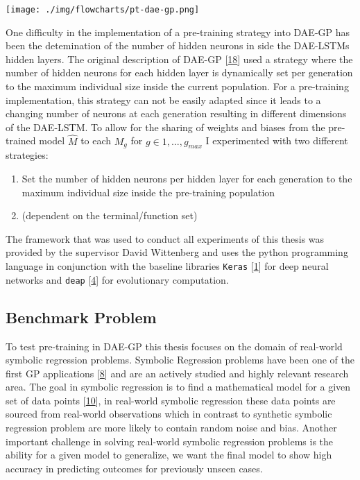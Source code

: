 \documentclass[
  11pt,
]{article}
\providecommand{\tightlist}{%
  \setlength{\itemsep}{0pt}\setlength{\parskip}{0pt}}
\let\origfigure\figure
\let\endorigfigure\endfigure
\renewenvironment{figure}[1][2] {
    \expandafter\origfigure\expandafter[H]
} {
    \endorigfigure
}
\begin{document}
\begin{figure}
\centering
\texttt{[image: ./img/flowcharts/pt-dae-gp.png]}
\caption{Flowchart - Pre-Trained DAE-GP}
\end{figure}

One difficulty in the implementation of a pre-training strategy into
DAE-GP has been the detemination of the number of hidden neurons in side
the DAE-LSTMs hidden layers. The original description of DAE-GP
{[}\protect\hyperlink{ref-dae-gp_2020_rtree}{18}{]} used a strategy
where the number of hidden neurons for each hidden layer is dynamically
set per generation to the maximum individual size inside the current
population. For a pre-training implementation, this strategy can not be
easily adapted since it leads to a changing number of neurons at each
generation resulting in different dimensions of the DAE-LSTM. To allow
for the sharing of weights and biases from the pre-trained model
\(\hat{M}\) to each \(M_g\) for \(g\in{1,...,g_{max}}\) I experimented
with two different strategies:

\begin{enumerate}
\def\labelenumi{\arabic{enumi}.}
\tightlist
\item
  Set the number of hidden neurons per hidden layer for each generation
  to the maximum individual size inside the pre-training population
\item
  (dependent on the terminal/function set)
\end{enumerate}

The framework that was used to conduct all experiments of this thesis
was provided by the supervisor David Wittenberg and uses the python
programming language in conjunction with the baseline libraries
\texttt{Keras} {[}\protect\hyperlink{ref-chollet2015keras}{1}{]} for
deep neural networks and \texttt{deap}
{[}\protect\hyperlink{ref-DEAP_JMLR2012}{4}{]} for evolutionary
computation.

\hypertarget{benchmark-problem}{%
\subsection{Benchmark Problem}\label{benchmark-problem}}

To test pre-training in DAE-GP this thesis focuses on the domain of
real-world symbolic regression problems. Symbolic Regression problems
have been one of the first GP applications
{[}\protect\hyperlink{ref-Koza1993GeneticP}{8}{]} and are an actively
studied and highly relevant research area. The goal in symbolic
regression is to find a mathematical model for a given set of data
points
{[}\protect\hyperlink{ref-10.1007ux2f978-3-540-24621-3_22}{10}{]}, in
real-world symbolic regression these data points are sourced from
real-world observations which in contrast to synthetic symbolic
regression problem are more likely to contain random noise and bias.
Another important challenge in solving real-world symbolic regression
problems is the ability for a given model to generalize, we want the
final model to show high accuracy in predicting outcomes for previously
unseen cases.
\end{document}
